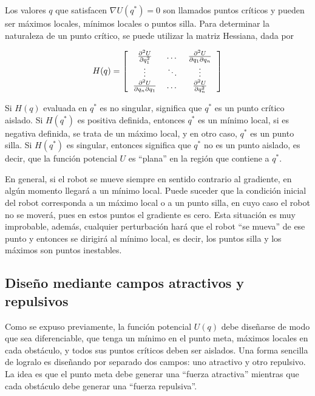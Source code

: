 \documentclass[letterpaper,12pt]{article}
\begin{document}
Los valores $q$ que satisfacen $\nabla U(q^*) = 0$ son llamados puntos críticos y pueden ser máximos locales, mínimos locales o puntos silla. Para determinar la naturaleza de un punto crítico, se puede utilizar la matriz Hessiana, dada por

\begin{equation}
  \label{eq:Hessian}
  H(q) = \left[
    \begin{tabular}{ccc}
      $\frac{\partial^2 U}{\partial q_1^2}$ &$ \dots$ &$ \frac{\partial^2 U}{\partial q_1 \partial q_n}$\\
      $\vdots$ & $\ddots$ & $\vdots$ \\
      $\frac{\partial^2 U}{\partial q_n\partial q_1}$ &$ \dots$ &$ \frac{\partial^2 U}{\partial q_n^2}$
    \end{tabular}
\right]
\end{equation}

Si $H(q)$ evaluada en $q^*$ es no singular, significa que $q^*$ es un punto crítico aislado. Si $H(q^*)$ es positiva definida, entonces $q^*$ es un mínimo local, si es negativa definida, se trata de un máximo local, y en otro caso, $q^*$ es un punto silla. Si $H(q^*)$ es singular, entonces significa que $q^*$ no es un punto aislado, es decir, que la función potencial $U$ es ``plana'' en la región que contiene a $q^*$. 

En general, si el robot se mueve siempre en sentido contrario al gradiente, en algún momento llegará a un mínimo local. Puede suceder que la condición inicial del robot corresponda a un máximo local o a un punto silla, en cuyo caso el robot no se moverá, pues en estos puntos el gradiente es cero. Esta situación es muy improbable, además, cualquier perturbación hará que el robot ``se mueva'' de ese punto y entonces se dirigirá al mínimo local, es decir, los puntos silla y los máximos son puntos inestables. 

\subsection{Diseño mediante campos atractivos y repulsivos}
Como se expuso previamente, la función potencial $U(q)$ debe diseñarse de modo que sea diferenciable, que tenga un mínimo en el punto meta, máximos locales en cada obstáculo, y todos sus puntos críticos deben ser aislados. Una forma sencilla de logralo es diseñando por separado dos campos: uno atractivo y otro repulsivo. La idea es que el punto meta debe generar una ``fuerza atractiva'' mientras que cada obstáculo debe generar una ``fuerza repulsiva''. 
\end{document}
